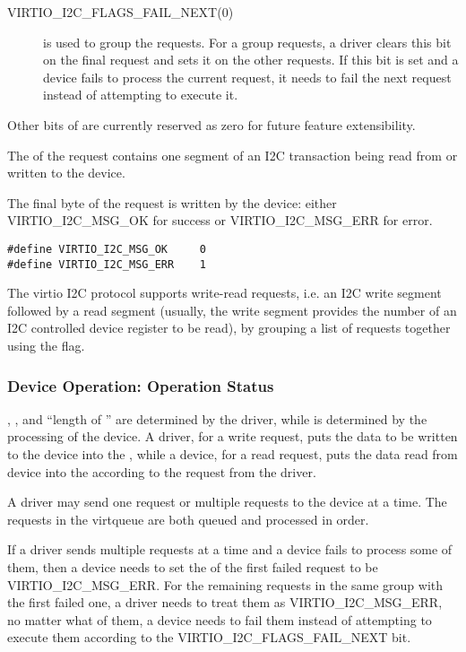 \begin{description}
\item[VIRTIO_I2C_FLAGS_FAIL_NEXT(0)] is used to group the requests.
    For a group requests, a driver clears this bit on the final request
    and sets it on the other requests. If this bit is set and a device fails
    to process the current request, it needs to fail the next request instead
    of attempting to execute it.
\end{description}

Other bits of  are currently reserved as zero for future feature
extensibility.

The  of the request contains one segment of an I2C transaction
being read from or written to the device.

The final  byte of the request is written by the device: either
VIRTIO_I2C_MSG_OK for success or VIRTIO_I2C_MSG_ERR for error.

\begin{lstlisting}
#define VIRTIO_I2C_MSG_OK     0
#define VIRTIO_I2C_MSG_ERR    1
\end{lstlisting}

The virtio I2C protocol supports write-read requests, i.e. an I2C write segment
followed by a read segment (usually, the write segment provides the number of an
I2C controlled device register to be read), by grouping a list of requests
together using the  flag.

\subsubsection{Device Operation: Operation Status}\label{sec:Device Types / I2C Adapter Device / Device Operation: Operation Status}

, , and ``length of '' are determined by the
driver, while  is determined by the processing of the device.  A
driver, for a write request, puts the data to be written to the device into the
, while a device, for a read request, puts the data read from device
into the  according to the request from the driver.

A driver may send one request or multiple requests to the device at a time.
The requests in the virtqueue are both queued and processed in order.

If a driver sends multiple requests at a time and a device fails to process
some of them, then a device needs to set the  of the first failed request
to be VIRTIO_I2C_MSG_ERR. For the remaining requests in the same group with
the first failed one, a driver needs to treat them as VIRTIO_I2C_MSG_ERR, no matter
what  of them, a device needs to fail them instead of attempting to
execute them according to the VIRTIO_I2C_FLAGS_FAIL_NEXT bit.

